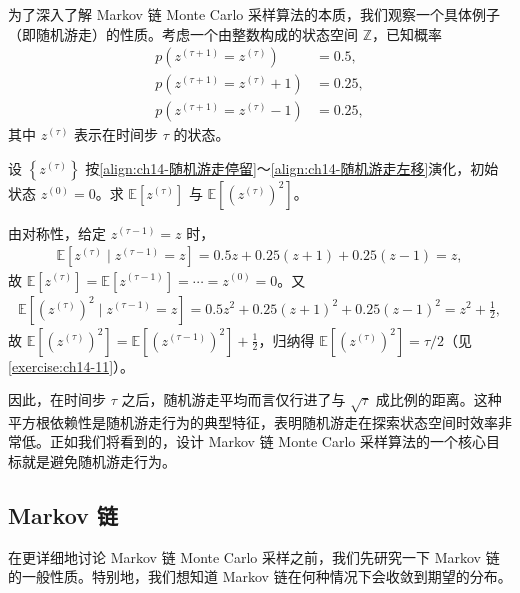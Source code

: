 \documentclass[../../main.tex]{subfiles}
\begin{document}
为了深入了解 Markov 链 Monte Carlo 采样算法的本质，我们观察一个具体例子（即随机游走）的性质。考虑一个由整数构成的状态空间 $\mathbb{Z}$，已知概率
\begin{align}
p\!\left(z^{(\tau+1)}=z^{(\tau)}\right)&=0.5,
\label{align:ch14-随机游走停留}\\
p\!\left(z^{(\tau+1)}=z^{(\tau)}+1\right)&=0.25,
\label{align:ch14-随机游走右移}\\
p\!\left(z^{(\tau+1)}=z^{(\tau)}-1\right)&=0.25,
\label{align:ch14-随机游走左移}
\end{align}
其中 $z^{(\tau)}$ 表示在时间步 $\tau$ 的状态。

\begin{example}[ 整数上的简单随机游走]\label{example:ch14-随机游走}
设 $\left\{z^{(\tau)}\right\}$ 按\eqref{align:ch14-随机游走停留}～\eqref{align:ch14-随机游走左移}演化，初始状态 $z^{(0)}=0$。求 $\mathbb{E}\left[z^{(\tau)}\right]$ 与 $\mathbb{E}\left[\left(z^{(\tau)}\right)^{2}\right]$。
\end{example}

\begin{solution}由对称性，给定 $z^{(\tau-1)}=z$ 时，
\begin{align*}
\mathbb{E}\left[z^{(\tau)}\mid z^{(\tau-1)}=z\right]=0.5z+0.25(z+1)+0.25(z-1)=z,
\end{align*}
故 $\mathbb{E}\left[z^{(\tau)}\right]=\mathbb{E}\left[z^{(\tau-1)}\right]=\cdots=z^{(0)}=0$。又
\begin{align*}
\mathbb{E}\left[\left(z^{(\tau)}\right)^{2}\mid z^{(\tau-1)}=z\right]=0.5z^{2}+0.25(z+1)^{2}+0.25(z-1)^{2}=z^{2}+\frac{1}{2},
\end{align*}
故 $\mathbb{E}\left[\left(z^{(\tau)}\right)^{2}\right]=\mathbb{E}\left[\left(z^{(\tau-1)}\right)^{2}\right]+\frac{1}{2}$，归纳得 $\mathbb{E}\left[\left(z^{(\tau)}\right)^{2}\right]=\tau/2$（见\cref{exercise:ch14-11}）。
\end{solution}

因此，在时间步 $\tau$ 之后，随机游走平均而言仅行进了与 $\sqrt{\tau}$ 成比例的距离。这种平方根依赖性是随机游走行为的典型特征，表明随机游走在探索状态空间时效率非常低。正如我们将看到的，设计 Markov 链 Monte Carlo 采样算法的一个核心目标就是避免随机游走行为。

\subsection{Markov 链}\label{subsection:ch14-markov链}

在更详细地讨论 Markov 链 Monte Carlo 采样之前，我们先研究一下 Markov 链的一般性质。特别地，我们想知道 Markov 链在何种情况下会收敛到期望的分布。
\end{document}
